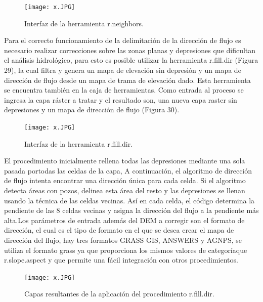 \documentclass[12pt,hidelinks]{article}
\begin{document}
\begin{figure}[H]
    \centering
    \texttt{[image: x.JPG]}
    \caption{Interfaz de la herramienta r.neighbors.}
    \label{fig:my_label}
\end{figure}
Para el correcto funcionamiento de la delimitación de la dirección de flujo es necesario realizar correcciones sobre las zonas planas y depresiones que dificultan el análisis hidrológico, para esto es posible utilizar la herramienta r.fill.dir (Figura 29), la cual filtra y genera un mapa de elevación sin depresión y un mapa de dirección de flujo desde un mapa de trama de elevación dado. Esta herramienta se encuentra también en la caja de herramientas. Como entrada al proceso se ingresa la capa ráster a tratar y el resultado son, una nueva capa raster sin depresiones y un mapa de dirección de flujo (Figura 30).

\begin{figure}[H]
    \centering
    \texttt{[image: x.JPG]}
    \caption{Interfaz de la herramienta r.fill.dir.}
    \label{fig:my_label}
\end{figure}
El procedimiento inicialmente rellena todas las depresiones mediante una sola pasada portodas las celdas de la capa, A continuación, el algoritmo de dirección de flujo intenta encontrar una dirección única para cada celda. Si el algoritmo detecta áreas con pozos, delinea esta área del resto y las depresiones se llenan usando la técnica de las celdas vecinas. Así en cada celda, el código determina la pendiente de las 8 celdas vecinas y asigna la dirección del flujo a la pendiente más alta.Los parámetros de entrada además del DEM a corregir son el formato de dirección, el cual es el tipo de formato en el que se desea crear el mapa de dirección del flujo, hay tres formatos GRASS GIS, ANSWERS y AGNPS, se utiliza el formato grass ya que proporciona los mismos valores de categoríaque r.slope.aspect y que permite una fácil integración con otros procedimientos.
\begin{figure}[H]
    \centering
    \texttt{[image: x.JPG]}
    \caption{Capas resultantes de la aplicación del procedimiento r.fill.dir.
}    \label{fig:my_label}
\end{figure}
\end{document}
